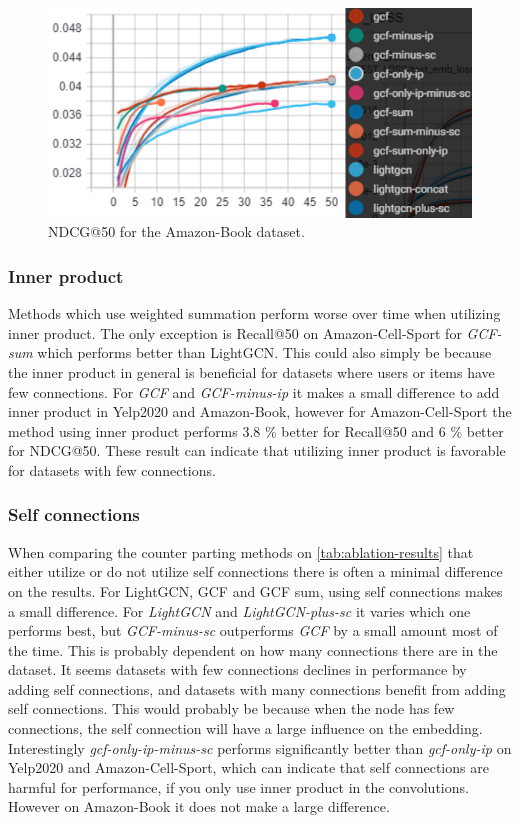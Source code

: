 \begin{figure}[]
    \includegraphics[width=\linewidth]{figures/amazon-book-gcf-all-ndcg.png}
    \caption{NDCG@50 for the Amazon-Book dataset.}
    \label{fig:GCF-NDCG-ablation-study-amazon-book}
\end{figure}

\subsubsection{Inner product}
Methods which use weighted summation perform worse over time when utilizing inner product.
The only exception is Recall@50 on Amazon-Cell-Sport for \textit{GCF-sum} which performs better than LightGCN.
This could also simply be because the inner product in general is beneficial for datasets where users or items have few connections.
For \textit{GCF} and \textit{GCF-minus-ip} it makes a small difference to add inner product in Yelp2020 and Amazon-Book, however for Amazon-Cell-Sport the method using inner product performs 3.8 \% better for Recall@50 and 6 \% better for NDCG@50.
These result can indicate that utilizing inner product is favorable for datasets with few connections.

\subsubsection{Self connections}
When comparing the counter parting methods on \autoref{tab:ablation-results} that either utilize or do not utilize self connections there is often a minimal difference on the results.
For LightGCN, GCF and GCF sum, using self connections makes a small difference.
For \textit{LightGCN} and \textit{LightGCN-plus-sc} it varies which one performs best, but \textit{GCF-minus-sc} outperforms \textit{GCF} by a small amount most of the time.
This is probably dependent on how many connections there are in the dataset.
It seems datasets with few connections declines in performance by adding self connections, and datasets with many connections benefit from adding self connections.
This would probably be because when the node has few connections, the self connection will have a large influence on the embedding.
Interestingly \textit{gcf-only-ip-minus-sc} performs significantly better than \textit{gcf-only-ip} on Yelp2020 and Amazon-Cell-Sport, which can indicate that self connections are harmful for performance, if you only use inner product in the convolutions.
However on Amazon-Book it does not make a large difference.

